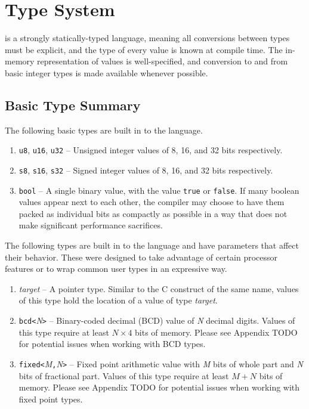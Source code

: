 \section{Type System}

\gx{} is a strongly statically-typed language, meaning all conversions
between types must be explicit, and the type of every value is known at
compile time. The in-memory representation of values is well-specified,
and conversion to and from basic integer types is made available whenever
possible.

\subsection{Basic Type Summary}

The following basic types are built in to the language.

\begin{enumerate}

\item {\tt u8}, {\tt u16}, {\tt u32} -- Unsigned integer values
of 8, 16, and 32 bits respectively.

\item {\tt s8}, {\tt s16}, {\tt s32} -- Signed integer values of 8,
16, and 32 bits respectively.

\item {\tt bool} -- A single binary value, with the value {\tt true}
or {\tt false}. If many boolean values appear next to each other, the
compiler may choose to have them packed as individual bits as compactly as
possible in a way that does not make significant performance sacrifices.

\end{enumerate}

The following types are built in to the language and have parameters that
affect their behavior. These were designed to take advantage of certain
processor features or to wrap common user types in an expressive way.

\begin{enumerate}

\item {\tt *}{\em target} -- A pointer type. Similar to the C construct
of the same name, values of this type hold the location of a value of
type {\em target}.

\item {\tt bcd<}{\em N}{\tt >} -- Binary-coded decimal (BCD) value of
{\em N} decimal digits. Values of this type require at least $N \times
4$ bits of memory. Please see Appendix TODO for potential issues when
working with BCD types.

\item {\tt fixed<}{\em M}{\tt,}{\em N}{\tt >} -- Fixed point arithmetic
value with {\em M} bits of whole part and {\em N} bits of fractional
part. Values of this type require at least $M + N$ bits of memory. Please
see Appendix TODO for potential issues when working with fixed point
types.

\end{enumerate}

